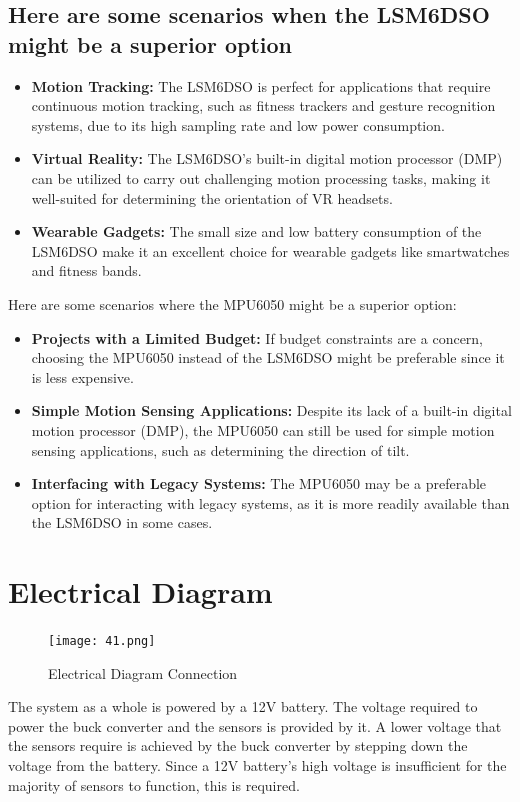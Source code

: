 \documentclass[
12pt,
oneside, 
onehalfspacing, 
nolistspacing, 
parskip, 
chapterinoneline, 
]{AASTCOMPUTER}
\begin{document}
\subsection*{Here are some scenarios when the LSM6DSO might be a superior option}
\begin{itemize}
\item \textbf{Motion Tracking:} The LSM6DSO is perfect for applications that require continuous motion tracking, such as fitness trackers and gesture recognition systems, due to its high sampling rate and low power consumption.
\item \textbf{Virtual Reality:} The LSM6DSO's built-in digital motion processor (DMP) can be utilized to carry out challenging motion processing tasks, making it well-suited for determining the orientation of VR headsets.
\item \textbf{Wearable Gadgets:} The small size and low battery consumption of the LSM6DSO make it an excellent choice for wearable gadgets like smartwatches and fitness bands.
\end{itemize}

Here are some scenarios where the MPU6050 might be a superior option:

\begin{itemize}
\item \textbf{Projects with a Limited Budget:} If budget constraints are a concern, choosing the MPU6050 instead of the LSM6DSO might be preferable since it is less expensive.
\item \textbf{Simple Motion Sensing Applications:} Despite its lack of a built-in digital motion processor (DMP), the MPU6050 can still be used for simple motion sensing applications, such as determining the direction of tilt.
\item \textbf{Interfacing with Legacy Systems:} The MPU6050 may be a preferable option for interacting with legacy systems, as it is more readily available than the LSM6DSO in some cases.
\end{itemize}
\section{Electrical Diagram}
\begin{figure}[!ht]
\centering
\texttt{[image: 41.png]}
\caption[Electrical Diagram Connection]{Electrical Diagram Connection}
\label{fig:TCU}
\end{figure}
The system as a whole is powered by a 12V battery. The voltage required to power the buck converter and the sensors is provided by it. A lower voltage that the sensors require is achieved by the buck converter by stepping down the voltage from the battery. Since a 12V battery's high voltage is insufficient for the majority of sensors to function, this is required.
\end{document}
